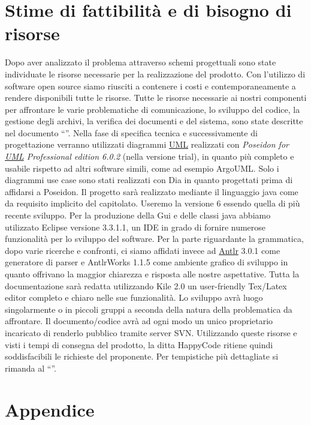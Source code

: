 \chapter{Stime di fattibilit\`a e di bisogno di risorse}
Dopo aver analizzato il problema attraverso schemi progettuali sono state individuate le risorse necessarie per la realizzazione del prodotto. Con l'utilizzo di software open source siamo riusciti a contenere i costi e contemporaneamente a rendere disponibili tutte le risorse.
Tutte le risorse necessarie ai nostri componenti per affrontare le varie problematiche di comunicazione, lo sviluppo del codice, la gestione degli archivi, la verifica dei documenti e del sistema, sono state descritte nel documento ``\PdQ''.
Nella fase di specifica tecnica e successivamente di progettazione verranno utilizzati diagrammi \underline{UML} realizzati con \textit{Poseidon for \underline{UML} Professional edition 6.0.2} (nella versione trial), in quanto pi\`u completo e usabile rispetto ad altri software simili, come ad esempio ArgoUML. Solo i diagrammi use case sono stati realizzati con Dia in quanto progettati prima di affidarsi a Poseidon.
Il progetto sar\`a realizzato mediante il linguaggio java come da requisito implicito del capitolato. Useremo la versione 6 essendo quella di pi\`u recente sviluppo.
Per la produzione della Gui e delle classi java abbiamo utilizzato Eclipse versione 3.3.1.1, un IDE in grado di fornire numerose funzionalit\`a per lo sviluppo del software.
Per la parte riguardante la grammatica, dopo varie ricerche e confronti, ci siamo affidati invece ad \underline{Antlr} 3.0.1 come generatore di parser e AntlrWorks 1.1.5 come ambiente grafico di sviluppo in quanto offrivano la maggior chiarezza e risposta alle nostre aspettative.
Tutta la documentazione sar\`a redatta utilizzando Kile 2.0 un user-friendly Tex/Latex editor completo e chiaro nelle sue funzionalit\`a.
Lo sviluppo avr\`a luogo singolarmente o in piccoli gruppi a seconda della natura della problematica da affrontare.
Il documento/codice avr\`a ad ogni modo un unico proprietario incaricato di renderlo pubblico tramite server SVN.
Utilizzando queste risorse e visti i tempi di consegna del prodotto, la ditta HappyCode ritiene quindi soddisfacibili le richieste del proponente.
Per tempistiche pi\`u dettagliate si rimanda al ``\PdP''.

\chapter{Appendice}
